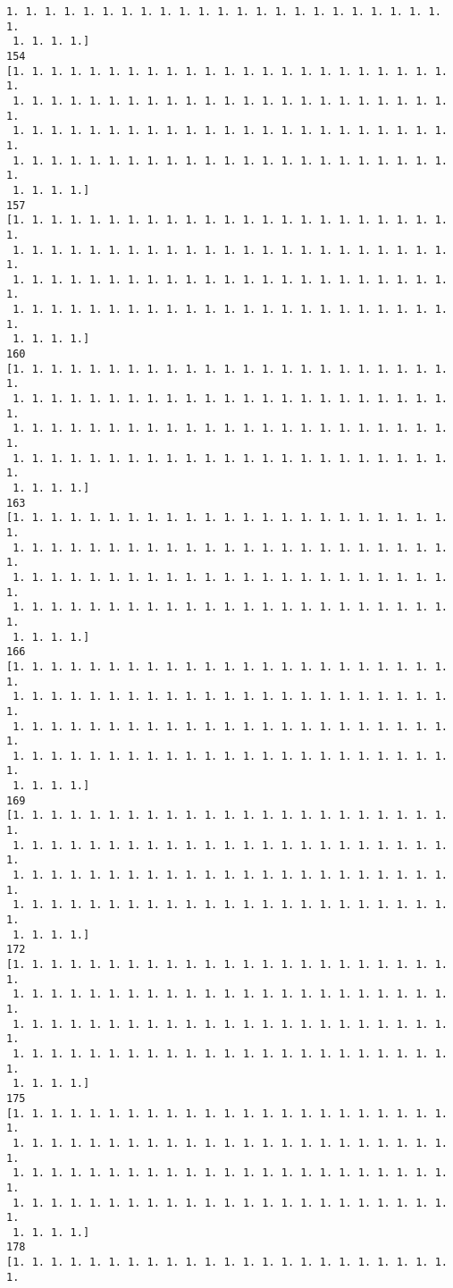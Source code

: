 \documentclass[11pt]{article}
\begin{document}
\begin{Verbatim}[commandchars=\\\{\}]
 1. 1. 1. 1. 1. 1. 1. 1. 1. 1. 1. 1. 1. 1. 1. 1. 1. 1. 1. 1. 1. 1. 1. 1.
 1. 1. 1. 1.]
154
[1. 1. 1. 1. 1. 1. 1. 1. 1. 1. 1. 1. 1. 1. 1. 1. 1. 1. 1. 1. 1. 1. 1. 1.
 1. 1. 1. 1. 1. 1. 1. 1. 1. 1. 1. 1. 1. 1. 1. 1. 1. 1. 1. 1. 1. 1. 1. 1.
 1. 1. 1. 1. 1. 1. 1. 1. 1. 1. 1. 1. 1. 1. 1. 1. 1. 1. 1. 1. 1. 1. 1. 1.
 1. 1. 1. 1. 1. 1. 1. 1. 1. 1. 1. 1. 1. 1. 1. 1. 1. 1. 1. 1. 1. 1. 1. 1.
 1. 1. 1. 1.]
157
[1. 1. 1. 1. 1. 1. 1. 1. 1. 1. 1. 1. 1. 1. 1. 1. 1. 1. 1. 1. 1. 1. 1. 1.
 1. 1. 1. 1. 1. 1. 1. 1. 1. 1. 1. 1. 1. 1. 1. 1. 1. 1. 1. 1. 1. 1. 1. 1.
 1. 1. 1. 1. 1. 1. 1. 1. 1. 1. 1. 1. 1. 1. 1. 1. 1. 1. 1. 1. 1. 1. 1. 1.
 1. 1. 1. 1. 1. 1. 1. 1. 1. 1. 1. 1. 1. 1. 1. 1. 1. 1. 1. 1. 1. 1. 1. 1.
 1. 1. 1. 1.]
160
[1. 1. 1. 1. 1. 1. 1. 1. 1. 1. 1. 1. 1. 1. 1. 1. 1. 1. 1. 1. 1. 1. 1. 1.
 1. 1. 1. 1. 1. 1. 1. 1. 1. 1. 1. 1. 1. 1. 1. 1. 1. 1. 1. 1. 1. 1. 1. 1.
 1. 1. 1. 1. 1. 1. 1. 1. 1. 1. 1. 1. 1. 1. 1. 1. 1. 1. 1. 1. 1. 1. 1. 1.
 1. 1. 1. 1. 1. 1. 1. 1. 1. 1. 1. 1. 1. 1. 1. 1. 1. 1. 1. 1. 1. 1. 1. 1.
 1. 1. 1. 1.]
163
[1. 1. 1. 1. 1. 1. 1. 1. 1. 1. 1. 1. 1. 1. 1. 1. 1. 1. 1. 1. 1. 1. 1. 1.
 1. 1. 1. 1. 1. 1. 1. 1. 1. 1. 1. 1. 1. 1. 1. 1. 1. 1. 1. 1. 1. 1. 1. 1.
 1. 1. 1. 1. 1. 1. 1. 1. 1. 1. 1. 1. 1. 1. 1. 1. 1. 1. 1. 1. 1. 1. 1. 1.
 1. 1. 1. 1. 1. 1. 1. 1. 1. 1. 1. 1. 1. 1. 1. 1. 1. 1. 1. 1. 1. 1. 1. 1.
 1. 1. 1. 1.]
166
[1. 1. 1. 1. 1. 1. 1. 1. 1. 1. 1. 1. 1. 1. 1. 1. 1. 1. 1. 1. 1. 1. 1. 1.
 1. 1. 1. 1. 1. 1. 1. 1. 1. 1. 1. 1. 1. 1. 1. 1. 1. 1. 1. 1. 1. 1. 1. 1.
 1. 1. 1. 1. 1. 1. 1. 1. 1. 1. 1. 1. 1. 1. 1. 1. 1. 1. 1. 1. 1. 1. 1. 1.
 1. 1. 1. 1. 1. 1. 1. 1. 1. 1. 1. 1. 1. 1. 1. 1. 1. 1. 1. 1. 1. 1. 1. 1.
 1. 1. 1. 1.]
169
[1. 1. 1. 1. 1. 1. 1. 1. 1. 1. 1. 1. 1. 1. 1. 1. 1. 1. 1. 1. 1. 1. 1. 1.
 1. 1. 1. 1. 1. 1. 1. 1. 1. 1. 1. 1. 1. 1. 1. 1. 1. 1. 1. 1. 1. 1. 1. 1.
 1. 1. 1. 1. 1. 1. 1. 1. 1. 1. 1. 1. 1. 1. 1. 1. 1. 1. 1. 1. 1. 1. 1. 1.
 1. 1. 1. 1. 1. 1. 1. 1. 1. 1. 1. 1. 1. 1. 1. 1. 1. 1. 1. 1. 1. 1. 1. 1.
 1. 1. 1. 1.]
172
[1. 1. 1. 1. 1. 1. 1. 1. 1. 1. 1. 1. 1. 1. 1. 1. 1. 1. 1. 1. 1. 1. 1. 1.
 1. 1. 1. 1. 1. 1. 1. 1. 1. 1. 1. 1. 1. 1. 1. 1. 1. 1. 1. 1. 1. 1. 1. 1.
 1. 1. 1. 1. 1. 1. 1. 1. 1. 1. 1. 1. 1. 1. 1. 1. 1. 1. 1. 1. 1. 1. 1. 1.
 1. 1. 1. 1. 1. 1. 1. 1. 1. 1. 1. 1. 1. 1. 1. 1. 1. 1. 1. 1. 1. 1. 1. 1.
 1. 1. 1. 1.]
175
[1. 1. 1. 1. 1. 1. 1. 1. 1. 1. 1. 1. 1. 1. 1. 1. 1. 1. 1. 1. 1. 1. 1. 1.
 1. 1. 1. 1. 1. 1. 1. 1. 1. 1. 1. 1. 1. 1. 1. 1. 1. 1. 1. 1. 1. 1. 1. 1.
 1. 1. 1. 1. 1. 1. 1. 1. 1. 1. 1. 1. 1. 1. 1. 1. 1. 1. 1. 1. 1. 1. 1. 1.
 1. 1. 1. 1. 1. 1. 1. 1. 1. 1. 1. 1. 1. 1. 1. 1. 1. 1. 1. 1. 1. 1. 1. 1.
 1. 1. 1. 1.]
178
[1. 1. 1. 1. 1. 1. 1. 1. 1. 1. 1. 1. 1. 1. 1. 1. 1. 1. 1. 1. 1. 1. 1. 1.

\end{Verbatim}
\end{document}
